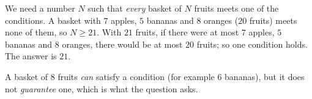 We need a number $N$ such that \emph{every} basket of $N$ fruits meets one of the conditions. A basket with $7$ apples, $5$ bananas and $8$ oranges ($20$ fruits) meets none of them, so $N\ge21$. With $21$ fruits, if there were at most $7$ apples, $5$ bananas and $8$ oranges, there would be at most $20$ fruits; so one condition holds. The answer is $\boxed{21}$.

A basket of $8$ fruits \emph{can} satisfy a condition (for example $6$ bananas), but it does not \emph{guarantee} one, which is what the question asks.
